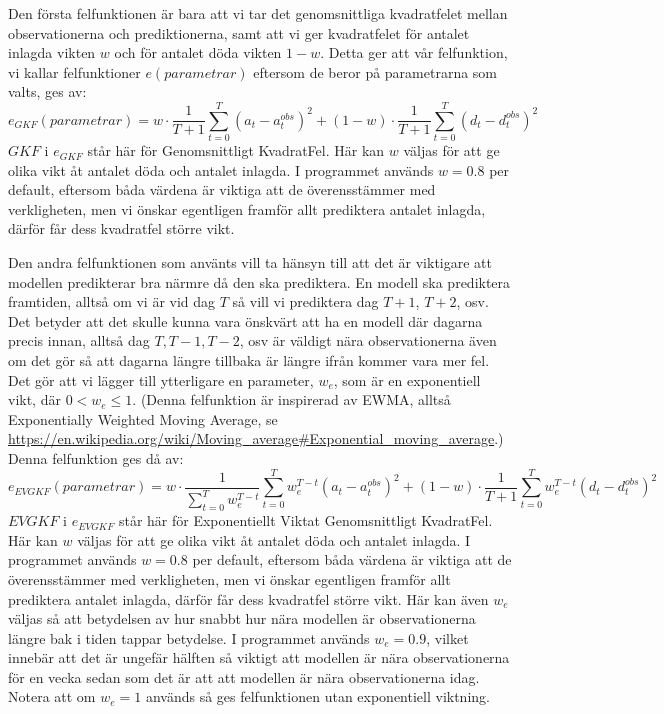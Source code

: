 \documentclass[a4paper, 12pt]{article}
\theoremstyle{definition}
\begin{document}
Den första felfunktionen är bara att vi tar det genomsnittliga kvadratfelet mellan observationerna och prediktionerna, samt att vi ger kvadratfelet för antalet inlagda vikten $w$ och för antalet döda vikten $1-w$. Detta ger att vår felfunktion, vi kallar felfunktioner $e(parametrar)$ eftersom de beror på parametrarna som valts, ges av:
\begin{equation}
  e_{GKF}(parametrar) = w\cdot \frac{1}{T+1}\sum_{t=0}^T (a_t-a_t^{obs})^2 + (1-w)\cdot \frac{1}{T+1}\sum_{t=0}^T (d_t-d_t^{obs})^2
\end{equation}
$GKF$ i $e_{GKF}$ står här för Genomsnittligt KvadratFel. Här kan $w$ väljas för att ge olika vikt åt antalet döda och antalet inlagda. I programmet används $w=0.8$ per default, eftersom båda värdena är viktiga att de överensstämmer med verkligheten, men vi önskar egentligen framför allt prediktera antalet inlagda, därför får dess kvadratfel större vikt.

Den andra felfunktionen som använts vill ta hänsyn till att det är viktigare att modellen predikterar bra närmre då den ska prediktera. En modell ska prediktera framtiden, alltså om vi är vid dag $T$ så vill vi prediktera dag $T+1$, $T+2$, osv. Det betyder att det skulle kunna vara önskvärt att ha en modell där dagarna precis innan, alltså dag $T, T-1, T-2$, osv är väldigt nära observationerna även om det gör så att dagarna längre tillbaka är längre ifrån kommer vara mer fel. Det gör att vi lägger till ytterligare en parameter, $w_e$, som är en exponentiell vikt, där $0<w_e\leq 1$. (Denna felfunktion är inspirerad av EWMA, alltså Exponentially Weighted Moving Average, se \url{https://en.wikipedia.org/wiki/Moving_average#Exponential_moving_average}.) Denna felfunktion ges då av:
\begin{equation}
  e_{EVGKF}(parametrar) = w\cdot \frac{1}{\sum_{t=0}^T w_e^{T-t}}\sum_{t=0}^T w_e^{T-t}(a_t-a_t^{obs})^2 + (1-w)\cdot \frac{1}{T+1}\sum_{t=0}^T w_e^{T-t}(d_t-d_t^{obs})^2
\end{equation}
$EVGKF$ i $e_{EVGKF}$ står här för Exponentiellt Viktat Genomsnittligt KvadratFel. Här kan $w$ väljas för att ge olika vikt åt antalet döda och antalet inlagda. I programmet används $w=0.8$ per default, eftersom båda värdena är viktiga att de överensstämmer med verkligheten, men vi önskar egentligen framför allt prediktera antalet inlagda, därför får dess kvadratfel större vikt. Här kan även $w_e$ väljas så att betydelsen av hur snabbt hur nära modellen är observationerna längre bak i tiden tappar betydelse. I programmet används $w_e=0.9$, vilket innebär att det är ungefär hälften så viktigt att modellen är nära observationerna för en vecka sedan som det är att att modellen är nära observationerna idag. Notera att om $w_e=1$ används så ges felfunktionen utan exponentiell viktning.
\end{document}
